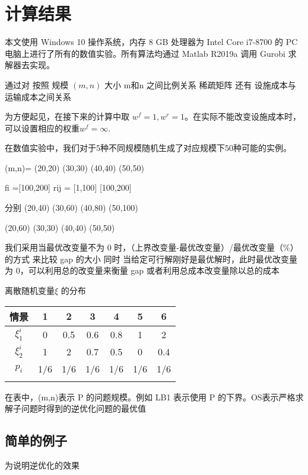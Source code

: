 \documentclass[UTF8]{article}
\begin{document}
\section{计算结果}

本文使用 Windows 10 操作系统，内存 8 GB 处理器为 Intel Core i7-8700 的 PC 电脑上进行了所有的数值实验。所有算法均通过 Matlab R2019a 调用 Gurobi 求解器去实现。

通过对
按照 规模 $(m,n)$ 大小  m和n 之间比例关系 稀疏矩阵 还有  设施成本与运输成本之间关系

为方便起见，在接下来的计算中取 $w^f=1,w^r=1$。在实际不能改变设施成本时，可以设置相应的权重$w^f=\infty$.

在数值实验中，我们对于5种不同规模随机生成了对应规模下50种可能的实例。

(m,n)= (20,20) (30,30) (40,40) (50,50)

fi =[100,200] rij = [1,100] [100,200]

分别 (20,40) (30,60) (40,80) (50,100)

(20,60) (30,30) (40,40) (50,50)

我们采用当最优改变量不为 0 时，（上界改变量-最优改变量）/最优改变量（$\%$）的方式
来比较 gap 的大小
同时 当给定可行解刚好是最优解时，此时最优改变量为 0，可以利用总的改变量来衡量 gap 或者利用总成本改变量除以总的成本

{\small\begin{table}[h!]

\centerline{\small{\heiti{}}  离散随机变量$\xi$ 的分布}
\vskip 2mm
\centering
\begin{tabular}{ccccccc}
    \shline
情景&1&2&3&4&5&6\\
    \hline
$\xi_1^i$ & 0 & 0.5 & 0.6  & 0.8  & 1 & 2\\
$\xi_2^i$ & 1 & 2   & 0.7  & 0.5 & 0 & 0.4\\

$p_i$ &1/6&1/6&1/6&1/6&1/6&1/6\\
   \shline
 \end{tabular}
 \end{table}}

在表中，(m,n)表示 P 的问题规模。例如
LB1 表示使用 P 的下界。OS表示严格求解子问题时得到的逆优化问题的最优值



\subsection{简单的例子}

为说明逆优化的效果
\end{document}
